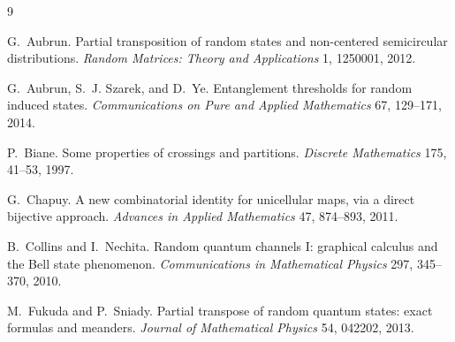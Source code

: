 \documentclass[11pt]{article}
\numberwithin{equation}{section}
\begin{document}
\begin{thebibliography}{9}

G.~Aubrun.
\newblock Partial transposition of random states and non-centered
semicircular distributions.
\newblock \emph{Random Matrices: Theory and Applications} 1, 1250001,
2012.

G.~Aubrun, S.~J. Szarek, and D.~Ye.
\newblock Entanglement thresholds for random induced states.
\newblock \emph{Communications on Pure and Applied Mathematics} 67,
129--171, 2014.

P.~Biane.
\newblock Some properties of crossings and partitions.
\newblock \emph{Discrete Mathematics} 175, 41--53, 1997.

G.~Chapuy.
\newblock A new combinatorial identity for unicellular maps, via a direct
bijective approach.
\newblock \emph{Advances in Applied Mathematics} 47, 874--893, 2011.

B.~Collins and I.~Nechita.
\newblock Random quantum channels I: graphical calculus and the Bell state
phenomenon.
\newblock \emph{Communications in Mathematical Physics} 297, 345--370,
2010.

M.~Fukuda and P.~Sniady.
\newblock Partial transpose of random quantum states: exact formulas and
meanders.
\newblock \emph{Journal of Mathematical Physics} 54, 042202, 2013.

\end{thebibliography}
\end{document}
